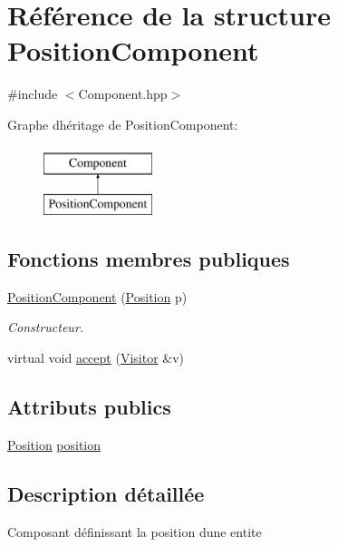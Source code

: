 \hypertarget{structPositionComponent}{}\section{Référence de la structure Position\+Component}
\label{structPositionComponent}


{\ttfamily \#include $<$Component.\+hpp$>$}

Graphe d\textquotesingle{}héritage de Position\+Component\+:\begin{figure}[H]
\begin{center}
\leavevmode
\includegraphics[height=2.000000cm]{structPositionComponent}
\end{center}
\end{figure}
\subsection*{Fonctions membres publiques}
\begin{DoxyCompactItemize}
\item 
\hyperlink{structPositionComponent_af8c7fde08522e4ad2c911a9759ce1808}{Position\+Component} (\hyperlink{structPosition}{Position} p)
\begin{DoxyCompactList}\small\item\em Constructeur. \end{DoxyCompactList}\item 
virtual void \hyperlink{structPositionComponent_a7f5ef56cf9e5722c7df9fdfa66fdf425}{accept} (\hyperlink{classVisitor}{Visitor} \&v)
\end{DoxyCompactItemize}
\subsection*{Attributs publics}
\begin{DoxyCompactItemize}
\item 
\hyperlink{structPosition}{Position} \hyperlink{structPositionComponent_a7fa8d03108cdb0645f12016ba8cd59c9}{position}
\end{DoxyCompactItemize}


\subsection{Description détaillée}
Composant définissant la position d\textquotesingle{}une entite 

